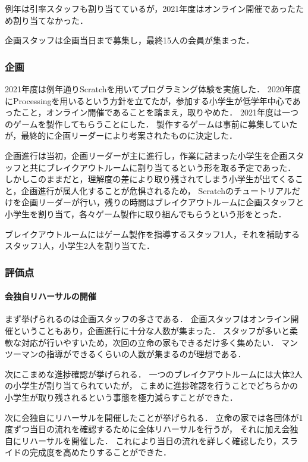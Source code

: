 例年は引率スタッフも割り当てているが，2021年度はオンライン開催であったため割り当てなかった．

企画スタッフは企画当日まで募集し，最終15人の会員が集まった．

\subsubsection*{企画}
2021年度は例年通りScratchを用いてプログラミング体験を実施した．
2020年度にProcessingを用いるという方針を立てたが，参加する小学生が低学年中心であったこと，オンライン開催であることを踏まえ，取りやめた．
2021年度は一つのゲームを製作してもらうことにした．
製作するゲームは事前に募集していたが，最終的に企画リーダーにより考案されたものに決定した．

企画進行は当初，企画リーダーが主に進行し，作業に詰まった小学生を企画スタッフと共にブレイクアウトルームに割り当てるという形を取る予定であった．
しかしこのままだと，理解度の差により取り残されてしまう小学生が出てくること，企画進行が属人化することが危惧されるため，
Scratchのチュートリアルだけを企画リーダーが行い，残りの時間はブレイクアウトルームに企画スタッフと小学生を割り当て，各々ゲーム製作に取り組んでもらうという形をとった．

ブレイクアウトルームにはゲーム製作を指導するスタッフ1人，それを補助するスタッフ1人，小学生2人を割り当てた．

\subsubsection*{評価点}
\paragraph{会独自リハーサルの開催}
まず挙げられるのは企画スタッフの多さである．
企画スタッフはオンライン開催ということもあり，企画進行に十分な人数が集まった．
スタッフが多いと柔軟な対応が行いやすいため，次回の立命の家もできるだけ多く集めたい．
マンツーマンの指導ができるくらいの人数が集まるのが理想である．

次にこまめな進捗確認が挙げられる．
一つのブレイクアウトルームには大体2人の小学生が割り当てられていたが，
こまめに進捗確認を行うことでどちらかの小学生が取り残されるという事態を極力減らすことができた．

次に会独自にリハーサルを開催したことが挙げられる．
立命の家では各団体が1度ずつ当日の流れを確認するために全体リハーサルを行うが，
それに加え会独自にリハーサルを開催した．
これにより当日の流れを詳しく確認したり，スライドの完成度を高めたりすることができた．

